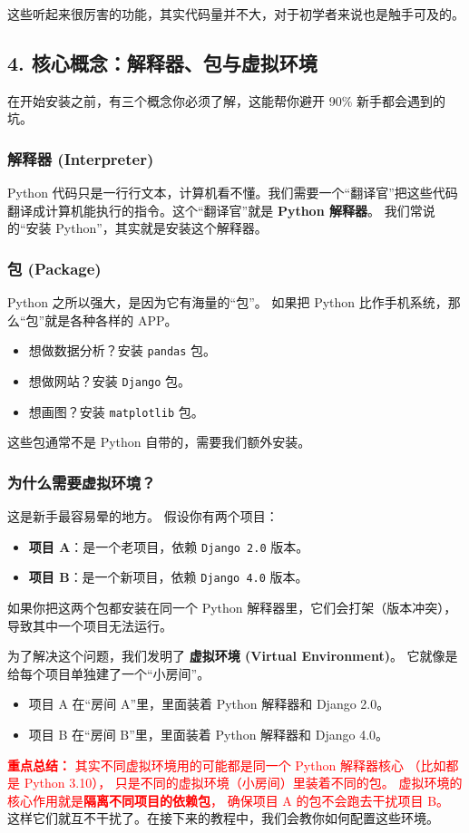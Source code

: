 这些听起来很厉害的功能，其实代码量并不大，对于初学者来说也是触手可及的。

\subsection*{4. 核心概念：解释器、包与虚拟环境}
在开始安装之前，有三个概念你必须了解，这能帮你避开 90\% 新手都会遇到的坑。

\subsubsection*{解释器 (Interpreter)}
Python 代码只是一行行文本，计算机看不懂。我们需要一个“翻译官”把这些代码翻译成计算机能执行的指令。这个“翻译官”就是 \textbf{Python 解释器}。
我们常说的“安装 Python”，其实就是安装这个解释器。

\subsubsection*{包 (Package)}
Python 之所以强大，是因为它有海量的“包”。
如果把 Python 比作手机系统，那么“包”就是各种各样的 APP。
\begin{itemize}
    \item 想做数据分析？安装 \texttt{pandas} 包。
    \item 想做网站？安装 \texttt{Django} 包。
    \item 想画图？安装 \texttt{matplotlib} 包。
\end{itemize}
这些包通常不是 Python 自带的，需要我们额外安装。

\subsubsection*{为什么需要虚拟环境？}
这是新手最容易晕的地方。
假设你有两个项目：
\begin{itemize}
    \item \textbf{项目 A}：是一个老项目，依赖 \texttt{Django 2.0} 版本。
    \item \textbf{项目 B}：是一个新项目，依赖 \texttt{Django 4.0} 版本。
\end{itemize}
如果你把这两个包都安装在同一个 Python 解释器里，它们会打架（版本冲突），导致其中一个项目无法运行。

为了解决这个问题，我们发明了 \textbf{虚拟环境 (Virtual Environment)}。
它就像是给每个项目单独建了一个“小房间”。
\begin{itemize}
    \item 项目 A 在“房间 A”里，里面装着 Python 解释器和 Django 2.0。
    \item 项目 B 在“房间 B”里，里面装着 Python 解释器和 Django 4.0。
\end{itemize}

\textcolor{red}{
    \textbf{重点总结：}
    其实不同虚拟环境用的可能都是同一个 Python 解释器核心
    （比如都是 Python 3.10），
    只是不同的虚拟环境（小房间）里装着不同的包。
    虚拟环境的核心作用就是\textbf{隔离不同项目的依赖包}，
    确保项目 A 的包不会跑去干扰项目 B。
}\\[0.5em]

这样它们就互不干扰了。在接下来的教程中，我们会教你如何配置这些环境。
\newpage
